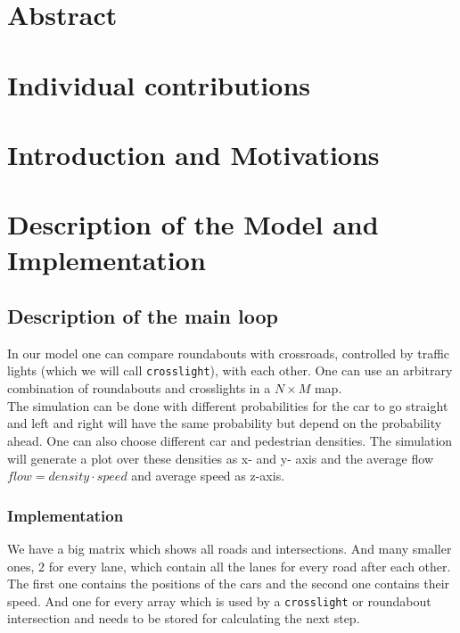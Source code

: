 \documentclass[11pt]{article}
\begin{document}

\tableofcontents

\newpage




\section{Abstract}

\section{Individual contributions}

\section{Introduction and Motivations}

\section{Description of the Model and Implementation}

\subsection{Description of the main loop}

In our model one can compare roundabouts with crossroads, controlled by traffic lights (which we will call \texttt{crosslight}), with each other. One can use an arbitrary combination of roundabouts and crosslights in a $N \times M$ map. \\
The simulation can be done with different probabilities for the car to go straight and left and right will have the same probability but depend on the probability ahead. One can also choose different car and pedestrian densities. 
The simulation will generate a plot over these densities as x- and y- axis and the average flow $flow = density \cdot speed$ and average speed as z-axis. 

\subsubsection{Implementation}

We have a big matrix which shows all roads and intersections. And many smaller ones, 2 for every lane, which contain all the lanes for every road after each other. 
The first one contains the positions of the cars and the second one contains their speed. And one for every array which is used by a \texttt{crosslight} or roundabout intersection and needs to be stored for calculating the next step.\\
\end{document}
